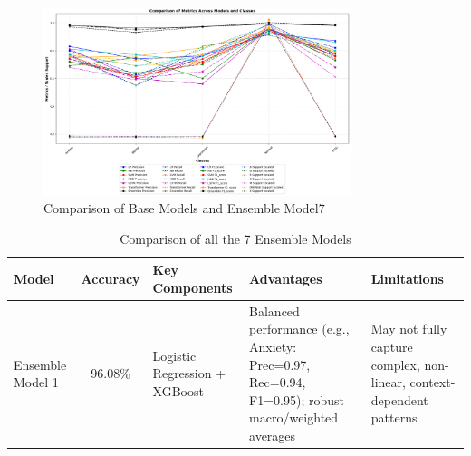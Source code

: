 \begin{figure}[h!]  
    \centering
    \includegraphics[width=0.8\textwidth]{Images/EM T RESULT.png}  
    \caption{Comparison of Base Models and Ensemble Model7}
    \label{lstm arch}  %
\end{figure}

\begin{table}[H]
    \centering
    \caption*{Comparison of all the 7 Ensemble Models}
    \label{tab:ensemble_comparison}
    \begin{tabularx}{\textwidth}{|l|c|X|X|X|}
    \hline
    \textbf{Model} & \textbf{Accuracy} & \textbf{Key Components} & \textbf{Advantages} & \textbf{Limitations} \\
    \hline
    Ensemble Model 1 & 96.08\% & Logistic Regression + XGBoost & Balanced performance (e.g., Anxiety: Prec=0.97, Rec=0.94, F1=0.95); robust macro/weighted averages & May not fully capture complex, non-linear, context-dependent patterns \\
    \hline
\end{tabularx}
\end{table}

\pagebreak

